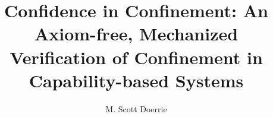 \documentclass[12pt,oneside,final]{thesis}
\begin{document}
\title{Confidence in Confinement: An Axiom-free, Mechanized Verification of Confinement in Capability-based Systems}
\author{M. Scott Doerrie}
\dissertation
\doctorphilosophy
\copyrightnotice

\setcounter{page}{1}

\maketitle

\listoffixmes












\newpage




\setcounter{tocdepth}{4}
\clearpage{}
\tableofcontents

\newpage

\listoftables

\newpage

\listoffigures

\newpage

\setcounter{page}{1}




















\end{document}
